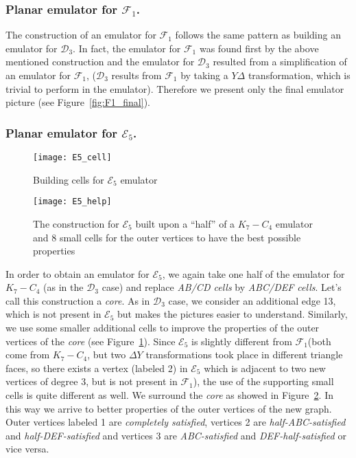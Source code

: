\documentclass[envcountsect,envcountsame]{llncs}
\renewenvironment{accumulate}{}{}
\newcommand{\KK}{\ensuremath{{K}_7 - C_4}\xspace}
\newcommand{\DD}{\ensuremath{\mathcal{D}_3}\xspace}
\newcommand{\EEE}{\ensuremath{\mathcal{E}_5}\xspace}
\newcommand{\FF}{\ensuremath{\mathcal{F}_1}\xspace}
\begin{document}
\begin{accumulate}
\subsubsection{Planar emulator for \FF.}

The construction of an emulator for \FF follows the same pattern as building
an emulator for \DD.  In fact, the emulator for \FF was found first by the
above mentioned construction and the emulator for \DD resulted from a
simplification of an emulator for \FF, (\DD results from \FF by taking a
{\ensuremath{Y \Delta}} transformation, which is trivial to perform in the
emulator).  Therefore we present only the final emulator picture (see
Figure~\ref{fig:F1_final}).



\subsubsection{Planar emulator for \EEE.}

\begin{figure}[bt]
\centering
\texttt{[image: E5\_cell]}
\caption{Building cells for \EEE emulator}
\label{fig:E5_cells}
\end{figure}

\begin{figure}[tbp]
\centering
\texttt{[image: E5\_help]}
\caption{The construction for \EEE built upon a ``half'' of a 
	\KK emulator and 8 small cells for the outer vertices to have the best possible properties}
\label{fig:E5_help}
\end{figure}

In order to obtain an emulator for \EEE, we again take one half of the emulator for \KK
(as in the \DD case) and replace \textit{AB/CD cells} by
\textit{ABC/DEF cells}.  Let's call this construction a \textit{core}.  As
in \DD case, we consider an additional edge 13, which is not present in
\EEE but makes the pictures easier to understand.  Similarly, we use some
smaller additional cells to improve the properties of the outer vertices of
the \textit{core} (see Figure~\ref{fig:E5_cells}).  Since \EEE is slightly
different from \FF (both come from \KK, but two {\ensuremath{\Delta Y}}
transformations took place in different triangle faces, so there exists a
vertex (labeled 2) in \EEE which is adjacent to two new vertices of
degree 3, but is not present in \FF), the use of the supporting
small cells is quite different as well.  We surround the \textit{core} as showed in Figure~\ref{fig:E5_help}.  In this way we arrive to better
properties of the outer vertices of the new graph.  Outer vertices labeled 1 are \textit{completely satisfied}, vertices 2 are
\textit{half-ABC-satisfied} and \textit{half-DEF-satisfied} and vertices 3
are \textit{ABC-satisfied} and \textit{DEF-half-satisfied} or vice versa.



\end{accumulate}
\end{document}
